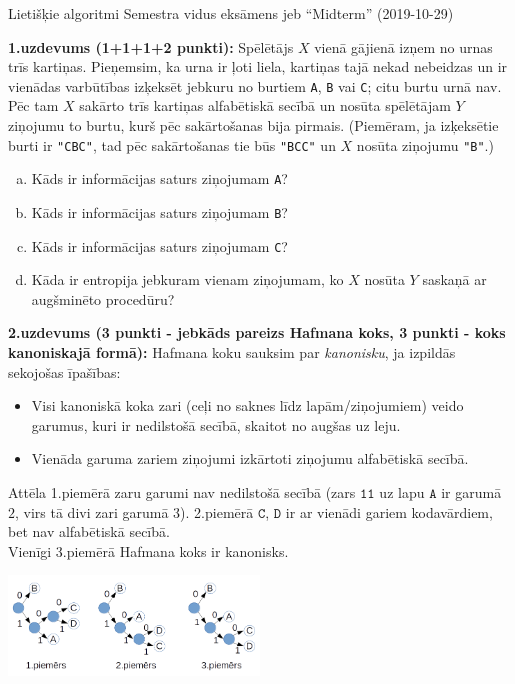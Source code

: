 \documentclass[11pt]{article}
\begin{document}
\thispagestyle{empty}

{\Large Lietišķie algoritmi \textendash{} Semestra vidus eksāmens jeb ``Midterm'' (2019-10-29)}

\noindent
{\bf 1.uzdevums (1+1+1+2 punkti):}
Spēlētājs $X$ vienā gājienā izņem no urnas trīs kartiņas. 
Pieņemsim, ka urna ir ļoti liela, kartiņas tajā nekad nebeidzas un ir vienādas varbūtības
izķeksēt jebkuru no burtiem {\tt A}, {\tt B} vai {\tt C}; citu burtu urnā nav.
Pēc tam $X$ sakārto trīs kartiņas alfabētiskā secībā un nosūta spēlētājam $Y$ ziņojumu \textendash{} to burtu, kurš 
pēc sakārtošanas bija pirmais. (Piemēram, ja izķeksētie burti ir {\tt "CBC"}, tad pēc sakārtošanas tie būs {\tt "BCC"} un 
$X$ nosūta ziņojumu {\tt "B"}.) 
\begin{enumerate}[(a)]
\item Kāds ir informācijas saturs ziņojumam {\tt A}?
\item Kāds ir informācijas saturs ziņojumam {\tt B}? 
\item Kāds ir informācijas saturs ziņojumam {\tt C}? 
\item Kāda ir entropija jebkuram vienam ziņojumam, ko $X$ nosūta $Y$ saskaņā ar augšminēto procedūru?
\end{enumerate}

\vspace{6pt}
\noindent
{\bf 2.uzdevums (3 punkti - jebkāds pareizs Hafmana koks, 3 punkti - koks kanoniskajā formā):}
Hafmana koku sauksim par {\em kanonisku}, ja izpildās sekojošas īpašības: 
\begin{itemize}
\item Visi kanoniskā koka zari (ceļi no saknes līdz lapām/ziņojumiem) veido garumus, kuri ir nedilstošā secībā, skaitot no augšas uz leju.
\item Vienāda garuma zariem ziņojumi izkārtoti ziņojumu alfabētiskā secībā. 
\end{itemize}
Attēla 1.piemērā zaru garumi nav nedilstošā secībā
(zars $\mathtt{11}$ uz lapu $\mathtt{A}$ ir garumā $2$, virs tā divi zari garumā $3$). 
2.piemērā $\mathtt{C}$, $\mathtt{D}$ ir ar vienādi gariem kodavārdiem, bet nav alfabētiskā secībā.\\
Vienīgi 3.piemērā Hafmana koks ir kanonisks.

\begin{center}
\includegraphics[width=0.5\textwidth]{fall2019-midterm/huffman-examples.png}
\end{center}
\end{document}

